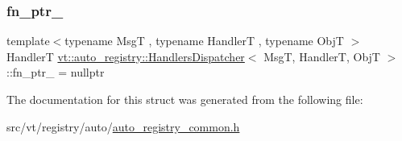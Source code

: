 \subsubsection{\texorpdfstring{fn\+\_\+ptr\+\_\+}{fn\_ptr\_}}
{\footnotesize\ttfamily template$<$typename MsgT , typename HandlerT , typename ObjT $>$ \\
HandlerT \hyperlink{structvt_1_1auto__registry_1_1_handlers_dispatcher}{vt\+::auto\+\_\+registry\+::\+Handlers\+Dispatcher}$<$ MsgT, HandlerT, ObjT $>$\+::fn\+\_\+ptr\+\_\+ = nullptr\hspace{0.3cm}{\ttfamily [private]}}



The documentation for this struct was generated from the following file\+:\begin{DoxyCompactItemize}
\item 
src/vt/registry/auto/\hyperlink{auto__registry__common_8h}{auto\+\_\+registry\+\_\+common.\+h}\end{DoxyCompactItemize}
